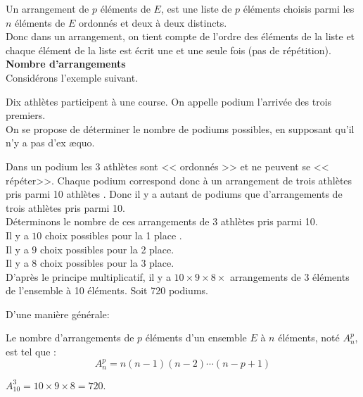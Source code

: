 Un arrangement de $ p $ éléments de $ E $, est une liste  de $ p $ éléments choisis parmi les $ n $ éléments de $ E $ ordonnés et deux à deux  distincts.\\
Donc dans un arrangement, on tient compte de l'ordre des éléments de la liste et chaque élément de la liste est  écrit une et une seule fois (pas de répétition).\\
\textbf{Nombre d'arrangements}\\
Considérons l'exemple suivant.
 \begin{example}
  Dix athlètes participent à une course. On appelle podium l'arrivée des trois premiers.\\
On se propose de déterminer le nombre  de podiums possibles, en supposant qu'il n'y a pas d'ex æquo.
\medskip


 
 Dans un  podium les 3 athlètes  sont << ordonnés >> et ne peuvent se << répéter>>. Chaque  podium correspond donc  à un arrangement de trois athlètes pris parmi 10 athlètes .
Donc il y a autant de podiums  que d'arrangements de trois athlètes pris parmi 10.\\
Déterminons le nombre de ces arrangements de $ 3$ athlètes pris parmi 10.\\
Il y a $ 10 $ choix possibles pour  la 1 place .\\
Il y a $ 9 $ choix possibles  pour la 2  place.\\
Il y a $ 8 $ choix possibles pour la 3 place.\\
D'après le principe multiplicatif, il y a $ 10 \times 9 \times 8 \times  $  arrangements de $ 3 $  éléments de l'ensemble à 10 éléments.  Soit  720 podiums.

 \end{example}
 D'une manière générale:
\begin{theorem}
Le nombre d'arrangements de $ p $ éléments  d'un ensemble $ E $ à $ n $ éléments,  noté  $ A_{n}^{p} $, est tel que :
\[  A_{n}^{p}= n(n-1)(n-2)\cdots (n-p+1)\]
\end{theorem}

\begin{example}
$A_{10}^{3} =10\times 9\times 8=720.  $
\end{example}

